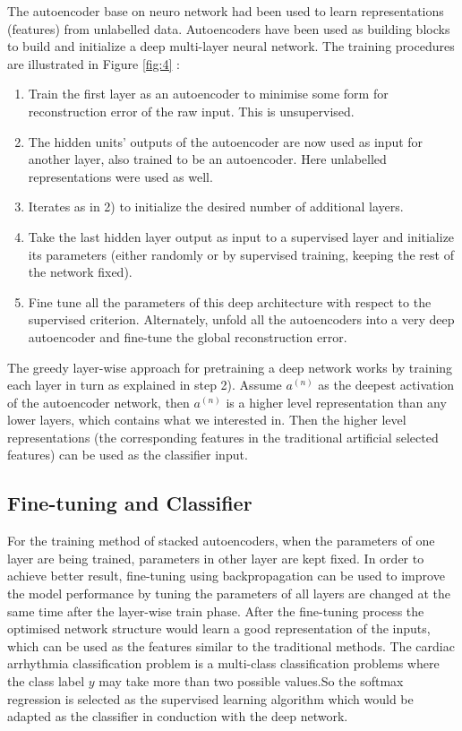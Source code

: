 \documentclass[graybox]{svmult}
\begin{document}
The autoencoder base on neuro network had been used to learn representations (features) from unlabelled data. Autoencoders have been used as building blocks to build and initialize a deep multi-layer neural network. The training procedures are illustrated in Figure \ref{fig:4} \citep{bengio2009learning}:
\begin{enumerate}
\item Train the first layer as an autoencoder to minimise some form for reconstruction error of the raw input. This is unsupervised.
\item The hidden units' outputs of the autoencoder are now used as input for another layer, also trained to be an autoencoder. Here unlabelled representations were used as well.
\item Iterates as in 2) to initialize the desired number of additional layers.
\item Take the last hidden layer output as input to a supervised layer and initialize its parameters (either randomly or by supervised training, keeping the rest of the network fixed).
\item Fine tune all the parameters of this deep architecture with respect to the supervised criterion. Alternately, unfold all the autoencoders into a very deep autoencoder and fine-tune the global reconstruction error.
\end{enumerate}
The greedy layer-wise approach for pretraining a deep network works by training each layer in turn as explained in step 2). Assume $a^{(n)}$ as the deepest activation of the autoencoder network, then $a^{(n)}$ is a higher level representation than any lower layers, which contains what we interested in. Then the higher level representations (the corresponding features in the traditional artificial selected features) can be used as the classifier input.


\subsection{Fine-tuning and Classifier}
For the training method of stacked autoencoders, when the parameters of one layer are being trained, parameters in other layer are kept fixed. In order to achieve better result, fine-tuning using backpropagation can be used to improve the model performance by tuning the parameters of all layers are changed at the same time after the layer-wise train phase. After the fine-tuning process the optimised network structure would learn a good representation of the inputs, which can be used as the features similar to the traditional methods. The cardiac arrhythmia classification problem is a multi-class classification problems where the class label $y$ may take more than two possible values.So the softmax regression is selected as the supervised learning algorithm which would be adapted as the classifier in conduction with the deep network.
\end{document}
